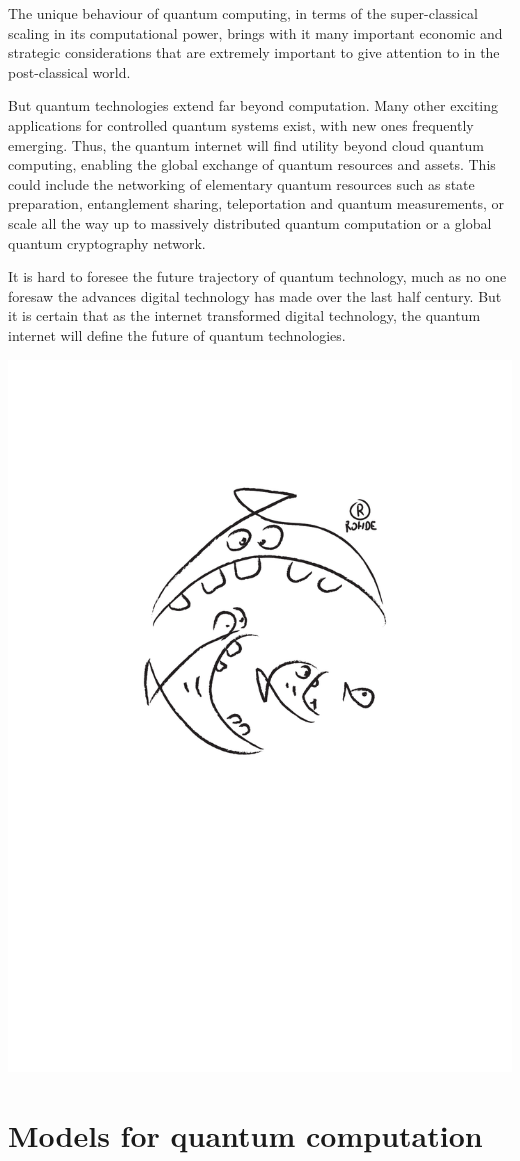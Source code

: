 \documentclass[aps, rmp, twocolumn, amsmath, amssymb, nofootinbib, superscriptaddress, longbibliography, floatfix, table-of-contents, eqsecnum]{revtex4-1}
\begin{document}
The unique behaviour of quantum computing, in terms of the super-classical scaling in its computational power, brings with it many important economic and strategic considerations that are extremely important to give attention to in the post-classical world.

But quantum technologies extend far beyond computation. Many other exciting applications for controlled quantum systems exist, with new ones frequently emerging. Thus, the quantum internet will find utility beyond cloud quantum computing, enabling the global exchange of quantum resources and assets. This could include the networking of elementary quantum resources such as state preparation, entanglement sharing, teleportation and quantum measurements, or scale all the way up to massively distributed quantum computation or a global quantum cryptography network.

It is hard to foresee the future trajectory of quantum technology, much as no one foresaw the advances digital technology has made over the last half century. But it is certain that as the internet transformed digital technology, the quantum internet will define the future of quantum technologies.

\begin{center}
	\includegraphics[width=0.6\columnwidth]{sketch_2}
\end{center}

%
%

\section{Models for quantum computation} \label{sec:models_QC} 
\end{document}
